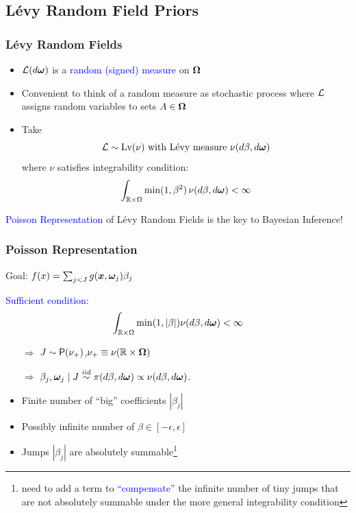 \documentclass[dvips]{beamer}
\newcommand{\bs}[2]{\begin{frame} \frametitle{#1} 
{#2}
\end{frame} }
\newcommand{\blue}{\textcolor{Blue}}
\begin{document}
\subsection{L\'evy Random Field Priors }

\bs{ L\'evy  Random Fields} {
  \begin{itemize}
  \item 
${\cal L}(d\bm \omega)$  is a \blue{random (signed) measure} on $\bm \Omega$ 

\item Convenient to think of a random measure as stochastic process where
${\cal L}$ assigns random variables  to sets $A \in \bm \Omega$

\item Take
$${\cal L} \sim \mbox{\rm Lv}(\nu) \text{ with L\'evy measure } \nu(d \beta, d
  \bm \omega)$$
where $\nu$ satisfies integrability condition:
$$\int_{\mathbb{R} \times \Omega} \min(1, \beta^2) \, \nu(d\beta, d
  \bm \omega) < \infty$$
  \end{itemize}

\blue{Poisson Representation} of L\'evy Random Fields is the key to
Bayesian Inference!
}

\bs{Poisson Representation}{ 
Goal: $f(x) = \sum_{j < J}  g(\bm x, \bm \omega_j) \beta_j$ 

\blue{Sufficient condition}:
$$\int_{\mathbb{R} \times \Omega} \min(1, |\beta|) \nu(d\beta, d
  \bm \omega) < \infty$$

\begin{itemize}
\item[$\Rightarrow$] $J \sim \mbox{\sf P}(\nu_+)$,\qquad $\nu_+\equiv
  \nu(\mathbb{R}\times\bm \Omega)$
\item[$\Rightarrow$] $\beta_j,\bm \omega_j \mid J \mathrel{\mathop{\sim}\limits^{\mathit{iid}}} \pi(d\beta, d\bm \omega)
  \propto \nu(d\beta,d\bm \omega)$.
\end{itemize}

\begin{itemize}
  \item Finite number of ``big'' coefficients $|\beta_j|$  
  \item Possibly infinite number of $\beta \in [-\epsilon, \epsilon]$
  \item Jumps $|\beta_j|$ are absolutely summable\footnote{need to add a term to
\blue{``compensate''} the infinite number of tiny jumps that are not
absolutely summable under the more general integrability condition}

  \end{itemize}
}
\end{document}
